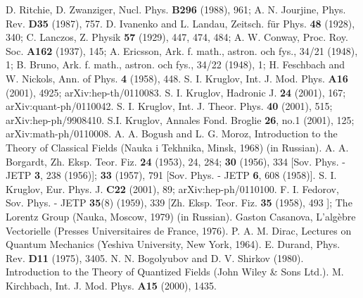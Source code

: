 \documentclass[a4paper,12pt]{article}
\begin{document}
\begin{thebibliography}{99}
D. Ritchie, D. Zwanziger,  Nucl. Phys. \textbf{B296} (1988), 961;
A. N. Jourjine,  Phys. Rev. \textbf{D35} (1987), 757.
 D. Ivanenko and L. Landau, Zeitsch. f\"ur Phys. \textbf{
48} (1928), 340; C. Lanczos, Z. Physik \textbf{57} (1929), 447,
474, 484; A. W. Conway, Proc. Roy. Soc. \textbf{A162} (1937), 145;
A. Ericsson,  Ark. f. math., astron. och fys., 34/21 (1948), 1; B.
Bruno, Ark. f. math., astron. och fys., 34/22 (1948), 1; H.
Feschbach and W. Nickols,  Ann. of Phys. \textbf{4} (1958), 448.
 S. I. Kruglov, Int. J. Mod. Phys. {\bf A16} (2001), 4925;
arXiv:hep-th/0110083.
 S. I. Kruglov, Hadronic J. {\bf 24} (2001), 167;
arXiv:quant-ph/0110042.
 S. I. Kruglov, Int. J. Theor. Phys. {\bf 40} (2001),
515; arXiv:hep-ph/9908410.
 S.I. Kruglov, Annales Fond. Broglie {\bf 26}, no.1 (2001), 125;
arXiv:math-ph/0110008.
 A. A. Bogush and L. G. Moroz,  Introduction to the
Theory of Classical Fields (Nauka i Tekhnika, Minsk, 1968) (in
Russian).
 A. A. Borgardt, Zh. Eksp. Teor. Fiz. \textbf{24} (1953), 24,
284; \textbf{30} (1956), 334 [Sov. Phys. - JETP \textbf{3}, 238
(1956)]; \textbf{33} (1957), 791 [Sov. Phys. - JETP \textbf{6},
608 (1958)].
 S. I. Kruglov, Eur. Phys. J. {\bf C22} (2001),
89; arXiv:hep-ph/0110100.
  F. I. Fedorov,  Sov. Phys. - JETP \textbf{35}(8) (1959), 339
[Zh. Eksp. Teor. Fiz. \textbf{35} (1958), 493 ]; The Lorentz Group
(Nauka, Moscow, 1979) (in Russian).
  Gaston Casanova,  L'alg\`ebre Vectorielle
(Presses Universitaires de France, 1976).
 P. A. M. Dirac, Lectures on Quantum Mechanics
(Yeshiva University, New York, 1964).
 E. Durand,  Phys. Rev. \textbf{D11} (1975), 3405.
  N. N. Bogolyubov and D. V. Shirkov (1980). Introduction to the
Theory of Quantized Fields (John Wiley \& Sons Ltd.).
 M. Kirchbach, Int. J. Mod. Phys. {\bf A15} (2000), 1435.

\end{thebibliography}
\end{document}
